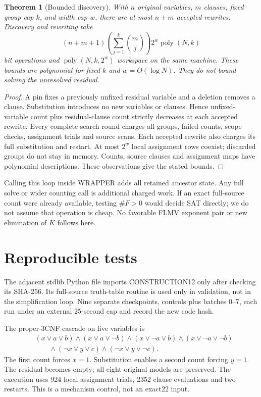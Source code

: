 \documentclass[11pt]{article}
\newtheorem{theorem}{Theorem}
\begin{document}
\begin{theorem}[Bounded discovery]
With $n$ original variables, $m$ clauses, fixed group cap $k$, and width cap
$w$, there are at most $n+m$ accepted rewrites. Discovery and rewriting take
\[
 (n+m+1)\left(\sum_{j=1}^{k}\binom mj\right)2^w
                   \operatorname{poly}(N,k)
\]
bit operations and $\operatorname{poly}(N,k,2^w)$ workspace on the same
machine. These bounds are polynomial for fixed $k$ and $w=O(\log N)$.
They do not bound solving the unresolved residual.
\end{theorem}
\begin{proof}
A pin fixes a previously unfixed residual variable and a deletion removes
a clause. Substitution introduces no new variables or clauses. Hence
unfixed-variable count plus residual-clause count strictly decreases at
each accepted rewrite. Every complete search round charges all groups,
failed counts, scope checks, assignment trials and source scans.
Each accepted rewrite also charges its full substitution and restart.
At most $2^w$ local assignment rows coexist; discarded groups do not stay
in memory. Counts, source clauses and assignment maps have polynomial
descriptions. These observations give the stated bounds.
\end{proof}
Calling this loop inside WRAPPER adds all retained ancestor state.
Any full solve or wider counting call is additional charged work.
If an exact full-source count were already available, testing $\#F>0$
would decide SAT directly; we do not assume that operation is cheap.
No favorable FLMV exponent pair or new elimination of $K$ follows here.

\section{Reproducible tests}
The adjacent stdlib Python file imports CONSTRUCTION12 only after checking
its SHA-256. Its full-source truth-table routine is used only in validation,
not in the simplification loop. Nine separate checkpoints, controls plus
batches 0--7, each run under an external 25-second cap and record the new
code hash.

The proper-3CNF cascade on five variables is
\[
\begin{split}
 &(x\vee a\vee b)\land(x\vee a\vee\neg b)
 \land(x\vee\neg a\vee b)\land(x\vee\neg a\vee\neg b)\\
 &\qquad{}\land(\neg x\vee y\vee c)\land(\neg x\vee y\vee\neg c).
\end{split}
\]
The first count forces $x=1$. Substitution enables a second count forcing
$y=1$. The residual becomes empty; all eight original models are preserved.
The execution uses 924 local assignment trials, 2352 clause evaluations and
two restarts. This is a mechanism control, not an exact22 input.
\end{document}
